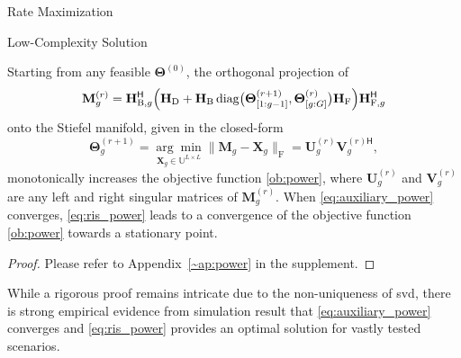 \documentclass[journal]{IEEEtran}
\begin{document}
\begin{section}{Rate Maximization}
\begin{subsection}{Low-Complexity Solution}
		\begin{proposition}
			\label{pp:power}
			Starting from any feasible $\mathbf{\Theta}^{(0)}$, the orthogonal projection of
			\begin{equation}
				\label{eq:auxiliary_power}
				\mathbf{M}_g^{(r)} = \mathbf{H}_{\mathrm{B},g}^\mathsf{H} \Bigl(\mathbf{H}_\mathrm{D} + \mathbf{H}_\mathrm{B} \operatorname{diag}\bigl(\mathbf{\Theta}_{[1:g-1]}^{(r+1)},\mathbf{\Theta}_{[g:G]}^{(r)}\bigr) \mathbf{H}_\mathrm{F}\Bigr) \mathbf{H}_{\mathrm{F},g}^\mathsf{H}
			\end{equation}
			onto the Stiefel manifold, given in the closed-form \cite{Manton2002}
			\begin{equation}
				\label{eq:ris_power}
				\mathbf{\Theta}_g^{(r+1)} = \underset{\mathbf{X}_g \in \mathbb{U}^{L \times L}}{\arg\min} \lVert \mathbf{M}_g - \mathbf{X}_g \rVert _\mathrm{F} = \mathbf{U}_g^{(r)} \mathbf{V}_g^{(r)\mathsf{H}},
			\end{equation}
			monotonically increases the objective function \eqref{ob:power},
			where $\mathbf{U}_g^{(r)}$ and $\mathbf{V}_g^{(r)}$ are any left and right singular matrices of $\mathbf{M}_g^{(r)}$.
			When \eqref{eq:auxiliary_power} converges, \eqref{eq:ris_power} leads to a convergence of the objective function \eqref{ob:power} towards a stationary point.
		\end{proposition}

		\begin{proof}
			Please refer to Appendix~\ref{~ap:power} in the supplement.
		\end{proof}

		\begin{remark}
			\label{rm:power}
			While a rigorous proof remains intricate due to the non-uniqueness of \gls{svd},
			there is strong empirical evidence from simulation result that
			\eqref{eq:auxiliary_power} converges and \eqref{eq:ris_power} provides an optimal solution for vastly tested scenarios.
		\end{remark}


\end{subsection}
\end{section}
\end{document}
